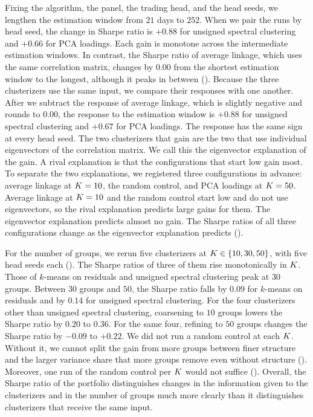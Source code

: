 Fixing the algorithm, the panel, the trading head, and the head seeds, we lengthen the estimation window from $21$ days to $252$. When we pair the runs by head seed, the change in Sharpe ratio is $+0.88$ for unsigned spectral clustering and $+0.66$ for PCA loadings. Each gain is monotone across the intermediate estimation windows. In contrast, the Sharpe ratio of average linkage, which uses the same correlation matrix, changes by $0.00$ from the shortest estimation window to the longest, although it peaks in between (). Because the three clusterizers use the same input, we compare their responses with one another. After we subtract the response of average linkage, which is slightly negative and rounds to $0.00$, the response to the estimation window is $+0.88$ for unsigned spectral clustering and $+0.67$ for PCA loadings. The response has the same sign at every head seed. The two clusterizers that gain are the two that use individual eigenvectors of the correlation matrix. We call this the eigenvector explanation of the gain. A rival explanation is that the configurations that start low gain most. To separate the two explanations, we registered three configurations in advance: average linkage at $K=10$, the random control, and PCA loadings at $K=50$. Average linkage at $K=10$ and the random control start low and do not use eigenvectors, so the rival explanation predicts large gains for them. The eigenvector explanation predicts almost no gain. The Sharpe ratios of all three configurations change as the eigenvector explanation predicts ().

For the number of groups, we rerun five clusterizers at $K \in \{10, 30, 50\}$, with five head seeds each (). The Sharpe ratios of three of them rise monotonically in $K$. Those of $k$-means on residuals and unsigned spectral clustering peak at $30$ groups. Between $30$ groups and $50$, the Sharpe ratio falls by $0.09$ for $k$-means on residuals and by $0.14$ for unsigned spectral clustering. For the four clusterizers other than unsigned spectral clustering, coarsening to $10$ groups lowers the Sharpe ratio by $0.20$ to $0.36$. For the same four, refining to $50$ groups changes the Sharpe ratio by $-0.09$ to $+0.22$. We did not run a random control at each $K$. Without it, we cannot split the gain from more groups between finer structure and the larger variance share that more groups remove even without structure (). Moreover, one run of the random control per $K$ would not suffice (). Overall, the Sharpe ratio of the portfolio distinguishes changes in the information given to the clusterizers and in the number of groups much more clearly than it distinguishes clusterizers that receive the same input.

